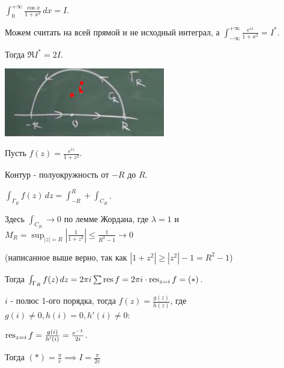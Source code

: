 \begin{example}
    $\int_0^{+\infty} \frac{\cos x}{1 + x^2} \, dx = I$.

    Можем считать на всей прямой и не исходный интеграл, а $\int_{-\infty}^{+\infty} \frac{e^{ix}}{1 + x^2} = I^*$.

    Тогда $\Re I^* = 2I$.

    \begin{center}
        \includegraphics[width=7cm]{./assets/04-functions-of-complex-variables/example-for-jordan-lemma.png}
    \end{center}

    Пусть $f(z) = \frac{e^{iz}}{1 + z^2}$.

    Контур - полуокружность от $-R$ до $R$.

    $\int_{\Gamma_R} f(z) \, dz = \int_{-R}^{R} + \int_{C_R}$.

    Здесь $\int_{C_R} \rightarrow 0$ по лемме Жордана, где $\lambda = 1$ и $M_R = \sup_{|z| = R} \left | \frac{1}{1 + z^2} \right | \leqslant \frac{1}{R^2 - 1} \rightarrow 0$

    (написанное выше верно, так как $|1 + z^2| \geqslant |z^2| - 1 = R^2 - 1$)

    Тогда $\int_{\Gamma_R} f(z) \, dz = 2 \pi i \sum \operatorname{res} f = 2 \pi i \cdot \operatorname{res}_{z = i} f = (*)$.

    $i$ - полюс 1-ого порядка, тогда $f(z) = \frac{g(z)}{h(z)}$, где $g(i) \neq 0, h(i) = 0, h'(i) \neq 0$:

    $\operatorname{res}_{z=i} f = \frac{g(i)}{h'(i)} = \frac{e^{-1}}{2i}$.

    Тогда $(*) = \frac{\pi}{e} \implies I = \frac{\pi}{2e}$

\end{example}

